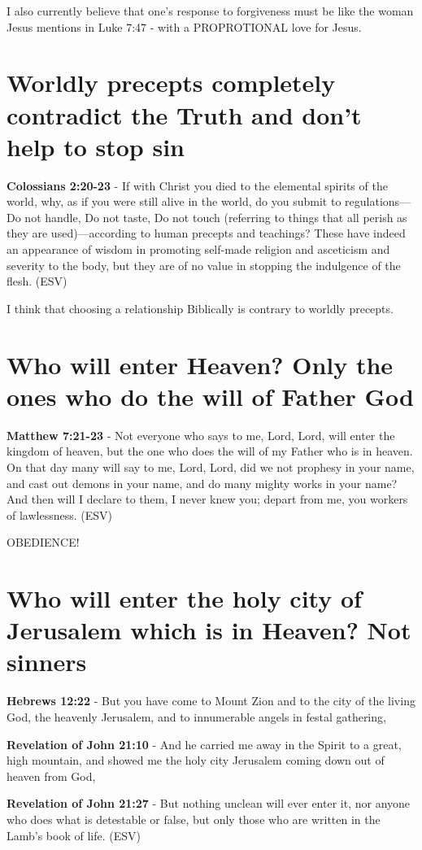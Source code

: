\documentclass[11pt]{article}
\begin{document}
I also currently believe that one's response to forgiveness must be like the woman Jesus mentions in Luke 7:47 - with a PROPROTIONAL love for Jesus.

\section{Worldly precepts completely contradict the Truth and don't help to stop sin}
\label{sec:orgc2452a4}
\textbf{Colossians 2:20-23} - If with Christ you died to the elemental spirits of the world, why, as if you were still alive in the world, do you submit to regulations— Do not handle, Do not taste, Do not touch (referring to things that all perish as they are used)—according to human precepts and teachings? These have indeed an appearance of wisdom in promoting self-made religion and asceticism and severity to the body, but they are of no value in stopping the indulgence of the flesh. (ESV)

I think that choosing a relationship Biblically is contrary to worldly precepts.

\section{Who will enter Heaven? Only the ones who do the will of Father God}
\label{sec:orgfca3458}
\textbf{Matthew 7:21-23} - Not everyone who says to me, Lord, Lord, will enter the kingdom of heaven, but the one who does the will of my Father who is in heaven. On that day many will say to me, Lord, Lord, did we not prophesy in your name, and cast out demons in your name, and do many mighty works in your name? And then will I declare to them, I never knew you; depart from me, you workers of lawlessness. (ESV)

OBEDIENCE!

\section{Who will enter the holy city of Jerusalem which is in Heaven? Not sinners}
\label{sec:org8f85f52}
\textbf{Hebrews 12:22} - But you have come to Mount Zion and to the city of the living God, the heavenly Jerusalem, and to innumerable angels in festal gathering,

\textbf{Revelation of John 21:10} - And he carried me away in the Spirit to a great, high mountain, and showed me the holy city Jerusalem coming down out of heaven from God,

\textbf{Revelation of John 21:27} -  But nothing unclean will ever enter it, nor anyone who does what is detestable or false, but only those who are written in the Lamb's book of life.  (ESV)
\end{document}
